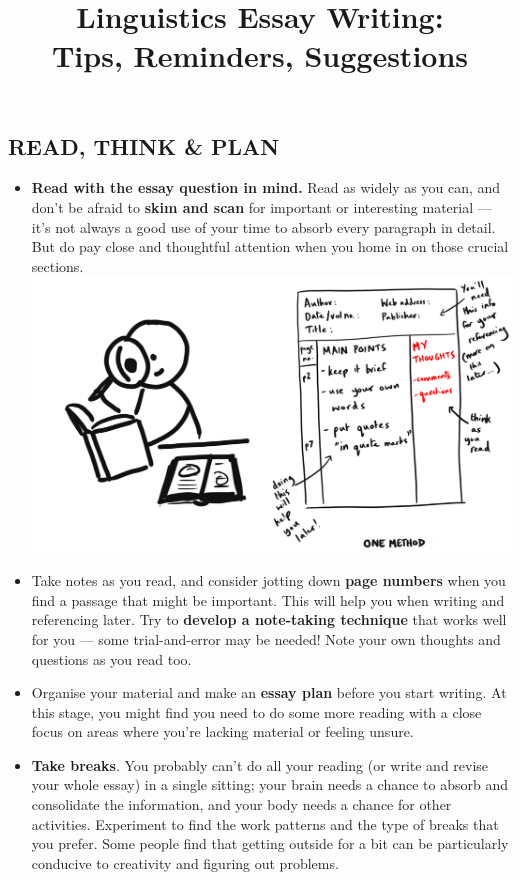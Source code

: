 \documentclass[10pt,a4paper]{article}
\begin{document}
\title{\LARGE\sffamily\bfseries Linguistics Essay Writing:\\Tips, Reminders,
Suggestions}
\date{}

\maketitle

\begin{multicols}{2}

\section*{READ, THINK \& PLAN}

\begin{itemize}
  \item \textbf{Read with the essay question in mind.} Read as widely as you can,
and don’t be afraid to \textbf{skim and scan} for important or interesting
material --- it’s not always a good use of your time to absorb every paragraph
in detail. But do pay close and thoughtful attention when you home in on those
crucial sections.
\includegraphics[width=0.9\columnwidth]{cartoons/read-take-notes.png}
  \item Take notes as you read, and consider jotting down \textbf{page numbers}
when you find a passage that might be important. This will help you when writing
and referencing later. Try to \textbf{develop a note-taking technique} that
works well for you --- some trial-and-error may be needed! Note your own
thoughts and questions as you read too.
  \item Organise your material and make an \textbf{essay plan} before you start
writing. At this stage, you might find you need to do some more reading with a
close focus on areas where you’re lacking material or feeling unsure.
  \item \textbf{Take breaks}. You probably can’t do all your reading (or write
and revise your whole essay) in a single sitting; your brain needs a chance to
absorb and consolidate the information, and your body needs a chance for other
activities. Experiment to find the work patterns and the type of breaks that you
prefer. Some people find that getting outside for a bit can be particularly
conducive to creativity and figuring out problems.
\end{itemize}


\end{multicols}
\end{document}

